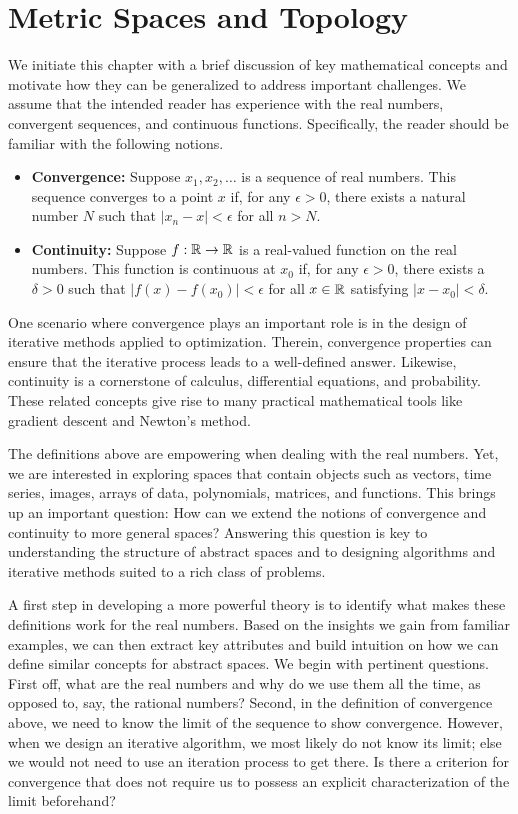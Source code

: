 \chapter{Metric Spaces and Topology}
\label{chap:metric_spaces}

We initiate this chapter with a brief discussion of key mathematical concepts and motivate how they can be generalized to address important challenges.
We assume that the intended reader has experience with the real numbers, convergent sequences, and continuous functions.
Specifically, the reader should be familiar with the following notions.
\begin{itemize}
\item \textbf{Convergence:}
Suppose $x_1, x_2, \ldots$ is a sequence of real numbers.
This sequence converges to a point $x$ if, for any $\epsilon > 0$, there exists a natural number $N$ such that $| x_n - x | < \epsilon$ for all $n > N$.
\item \textbf{Continuity:}
Suppose $f : \mathbb{R} \to \mathbb{R}$ is a real-valued function on the real numbers.
This function is continuous at $x_0$ if, for any $\epsilon > 0$, there exists a $\delta > 0$ such that $| f(x) - f(x_0) | < \epsilon$ for all $x \in \mathbb{R}$ satisfying $|x - x_0| < \delta$.
\end{itemize}

One scenario where convergence plays an important role is in the design of iterative methods applied to optimization.
Therein, convergence properties can ensure that the iterative process leads to a well-defined answer.
Likewise, continuity is a cornerstone of calculus, differential equations, and probability.
These related concepts give rise to many practical mathematical tools like gradient descent and Newton's method.

The definitions above are empowering when dealing with the real numbers.
Yet, we are interested in exploring spaces that contain objects such as vectors, time series, images, arrays of data, polynomials, matrices, and functions.
This brings up an important question: How can we extend the notions of convergence and continuity to more general spaces?
Answering this question is key to understanding the structure of abstract spaces and to designing algorithms and iterative methods suited to a rich class of problems.

A first step in developing a more powerful theory is to identify what makes these definitions work for the real numbers.
Based on the insights we gain from familiar examples, we can then extract key attributes and build intuition on how we can define similar concepts for abstract spaces.
We begin with pertinent questions.
First off, what are the real numbers and why do we use them all the time, as opposed to, say, the rational numbers?
Second, in the definition of convergence above, we need to know the limit of the sequence to show convergence.
However, when we design an iterative algorithm, we most likely do not know its limit; else we would not need to use an iteration process to get there.
Is there a criterion for convergence that does not require us to possess an explicit characterization of the limit beforehand?

